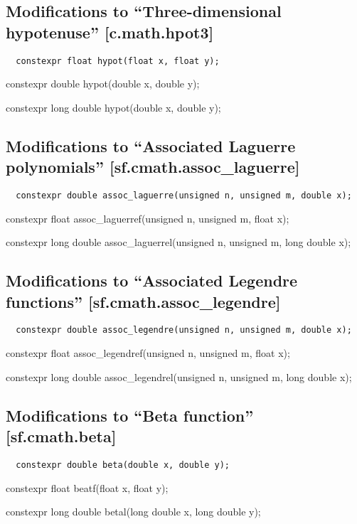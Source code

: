 \documentclass[prd,twocolumn,amsmath,amssymb,nofootinbib,eqsecnum]{revtex4-1}
\newcommand{\code}[1]{{\tt #1}}
\newcommand{\highlight}[1]{{\color{red} #1}}
\newcommand{\bigund}{{\Huge{\_}}}
\begin{document}
\subsection{Modifications to ``Three-dimensional hypotenuse''  [c.math.hpot3]}

\code{
	\highlight{constexpr} float hypot(float x, float y); 

	\highlight{constexpr} double hypot(double x, double y);

	\highlight{constexpr} long double hypot(double x, double y); 
}

\subsection{Modifications to  ``Associated Laguerre polynomials''  [sf.cmath.assoc{\bigund}laguerre]}

\code{
	\highlight{constexpr} double assoc\_laguerre(unsigned n, unsigned m, double x);
	
	\highlight{constexpr} float assoc\_laguerref(unsigned n, unsigned m, float x);
	
	\highlight{constexpr} long double assoc\_laguerrel(unsigned n, unsigned m, long double x);

}

\subsection{Modifications to  ``Associated Legendre functions''  [sf.cmath.assoc{\bigund}legendre]}

\code{
	\highlight{constexpr} double assoc\_legendre(unsigned n, unsigned m, double x);
	
	\highlight{constexpr} float assoc\_legendref(unsigned n, unsigned m, float x);
	
	\highlight{constexpr} long double assoc\_legendrel(unsigned n, unsigned m, long double x);

}

\subsection{Modifications to  ``Beta function''  [sf.cmath.beta]}

\code{
	\highlight{constexpr} double beta(double x, double y);
	
	\highlight{constexpr} float beatf(float x, float y);
	
	\highlight{constexpr} long double betal(long double x, long double y);
	
}
\end{document}
